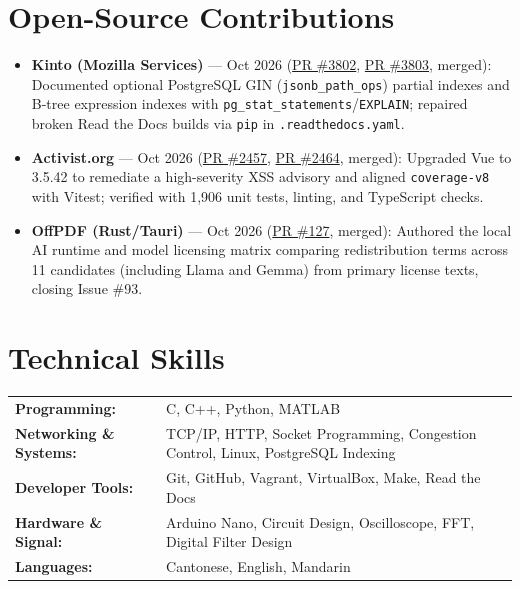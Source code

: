 \documentclass[10pt,a4paper]{article}
\begin{document}
\section{Open-Source Contributions}
\begin{itemize}
  \item \textbf{Kinto (Mozilla Services)} --- Oct 2026 (\href{https://github.com/Kinto/kinto/pull/3802}{PR \#3802}, \href{https://github.com/Kinto/kinto/pull/3803}{PR \#3803}, merged): Documented optional PostgreSQL GIN (\texttt{jsonb\_path\_ops}) partial indexes and B-tree expression indexes with \texttt{pg\_stat\_statements}/\texttt{EXPLAIN}; repaired broken Read the Docs builds via \texttt{pip} in \texttt{.readthedocs.yaml}.
  \item \textbf{Activist.org} --- Oct 2026 (\href{https://github.com/activist-org/activist/pull/2457}{PR \#2457}, \href{https://github.com/activist-org/activist/pull/2464}{PR \#2464}, merged): Upgraded Vue to 3.5.42 to remediate a high-severity XSS advisory and aligned \texttt{coverage-v8} with Vitest; verified with 1,906 unit tests, linting, and TypeScript checks.
  \item \textbf{OffPDF (Rust/Tauri)} --- Oct 2026 (\href{https://github.com/McanKul/offpdf/pull/127}{PR \#127}, merged): Authored the local AI runtime and model licensing matrix comparing redistribution terms across 11 candidates (including Llama and Gemma) from primary license texts, closing Issue \#93.
\end{itemize}

\section{Technical Skills}
\begin{tabularx}{\textwidth}{@{}l X@{}}
  \textbf{Programming:} & C, C++, Python, MATLAB \\
  \textbf{Networking \& Systems:} & TCP/IP, HTTP, Socket Programming, Congestion Control, Linux, PostgreSQL Indexing \\
  \textbf{Developer Tools:} & Git, GitHub, Vagrant, VirtualBox, Make, Read the Docs \\
  \textbf{Hardware \& Signal:} & Arduino Nano, Circuit Design, Oscilloscope, FFT, Digital Filter Design \\
  \textbf{Languages:} & Cantonese, English, Mandarin \\
\end{tabularx}
\end{document}
